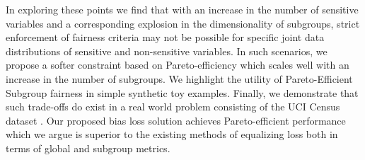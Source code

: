 In exploring these points we find that with an increase in the number of sensitive variables and a corresponding explosion in the dimensionality of subgroups, strict enforcement of fairness criteria may not be possible for specific joint data distributions of sensitive and non-sensitive variables. In such scenarios, we propose a softer constraint based on Pareto-efficiency \cite{Godfrey2007} which scales well with an increase in the number of subgroups. We highlight the utility of Pareto-Efficient Subgroup fairness in simple synthetic toy examples. Finally, we demonstrate that such trade-offs do exist in a real world problem consisting of the UCI Census dataset \cite{Dua:2017}.  Our proposed bias loss solution achieves Pareto-efficient performance which we argue is superior to the existing methods of equalizing loss both in terms of global and subgroup metrics. 

